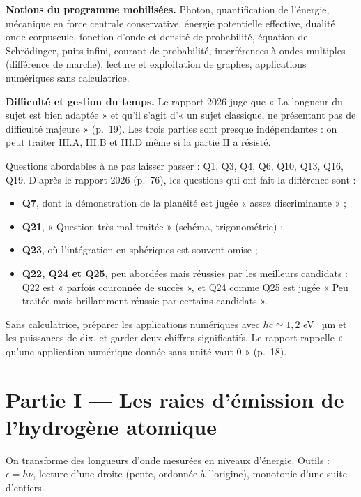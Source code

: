 \documentclass[11pt,a4paper]{article}
\providecommand{\tightlist}{\setlength{\itemsep}{0pt}\setlength{\parskip}{0pt}}
\begin{document}
\textbf{Notions du programme mobilisées.} Photon, quantification de l'énergie, mécanique en force centrale conservative, énergie potentielle effective, dualité onde-corpuscule, fonction d'onde et densité de probabilité, équation de Schrödinger, puits infini, courant de probabilité, interférences à ondes multiples (différence de marche), lecture et exploitation de graphes, applications numériques sans calculatrice.

\textbf{Difficulté et gestion du temps.} Le rapport 2026 juge que « La longueur du sujet est bien adaptée » et qu'il s'agit d'« un sujet classique, ne présentant pas de difficulté majeure » (p.~19). Les trois parties sont presque indépendantes : on peut traiter III.A, III.B et III.D même si la partie II a résisté.

Questions abordables à ne pas laisser passer : Q1, Q3, Q4, Q6, Q10, Q13, Q16, Q19. D'après le rapport 2026 (p.~76), les questions qui ont fait la différence sont :

\begin{itemize}
\tightlist
\item
  \textbf{Q7}, dont la démonstration de la planéité est jugée « assez discriminante » ;
\item
  \textbf{Q21}, « Question très mal traitée » (schéma, trigonométrie) ;
\item
  \textbf{Q23}, où l'intégration en sphériques est souvent omise ;
\item
  \textbf{Q22, Q24 et Q25}, peu abordées mais réussies par les meilleurs candidats : Q22 est « parfois couronnée de succès », et Q24 comme Q25 est jugée « Peu traitée mais brillamment réussie par certains candidats ».
\end{itemize}

Sans calculatrice, préparer les applications numériques avec \(hc\simeq1{,}2\) eV·µm et les puissances de dix, et garder deux chiffres significatifs. Le rapport rappelle « qu'une application numérique donnée sans unité vaut 0 » (p.~18).

\hypertarget{partie-i-les-raies-duxe9mission-de-lhydroguxe8ne-atomique}{%
\section{Partie I --- Les raies d'émission de l'hydrogène atomique}\label{partie-i-les-raies-duxe9mission-de-lhydroguxe8ne-atomique}}

On transforme des longueurs d'onde mesurées en niveaux d'énergie. Outils : \(\epsilon=h\nu\), lecture d'une droite (pente, ordonnée à l'origine), monotonie d'une suite d'entiers.
\end{document}
